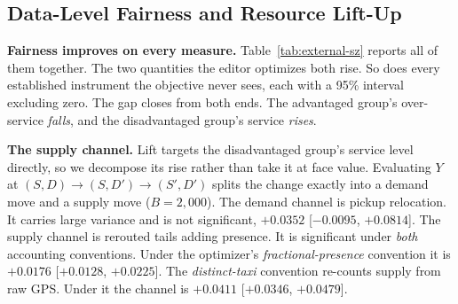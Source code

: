 \subsection{Data-Level Fairness and Resource Lift-Up}\label{sec:exp-data-level}\label{sec:exp-ablation}

\textbf{Fairness improves on every measure.}
Table~\ref{tab:external-sz} reports all of them together. The two quantities
the editor optimizes both rise. So does every established instrument the
objective never sees, each with a 95\% interval excluding zero. The gap closes
from both ends. The advantaged group's over-service \emph{falls}, and the
disadvantaged group's service \emph{rises}.


\textbf{The supply channel.} Lift targets the disadvantaged group's service
level directly, so we decompose its rise rather than take it at face value.
Evaluating $Y$ at $(S,D) \to (S,D') \to (S',D')$ splits the change exactly into
a demand move and a supply move ($B{=}2{,}000$). The demand channel is pickup
relocation. It carries large variance and is not significant, $+0.0352$
[$-0.0095$, $+0.0814$]. The supply channel is rerouted tails adding presence.
It is significant under \emph{both} accounting conventions. Under the
optimizer's \emph{fractional-presence} convention it is $+0.0176$ [$+0.0128$, $+0.0225$]. %
The \emph{distinct-taxi} convention re-counts supply from raw GPS. Under it
the channel is $+0.0411$ [$+0.0346$, $+0.0479$].

